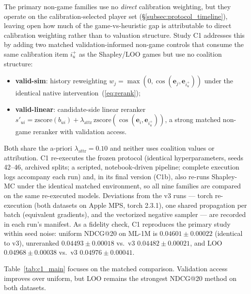 \documentclass[pdflatex,sn-mathphys-num]{sn-jnl}
\begin{document}
The primary non-game families use no \emph{direct} calibration weighting, but they operate on the calibration-selected player set (\S\ref{subsec:protocol_timeline}), leaving open how much of the game-vs-heuristic gap is attributable to direct calibration weighting rather than to valuation structure. Study C1 addresses this by adding two matched validation-informed non-game controls that consume the same calibration item $i_u^+$ as the Shapley/LOO games but use no coalition structure:
\begin{itemize}
    \item \textbf{valid-sim}: history reweighting $w_j=\max(0,\cos(\mathbf{e}_j,\mathbf{e}_{i_u^+}))$ under the identical native intervention~(\ref{eq:rerank});
    \item \textbf{valid-linear}: candidate-side linear reranker $s'_{ui}=\mathrm{zscore}(b_{ui})+\lambda_{\text{attr}}\,\mathrm{zscore}(\cos(\mathbf{e}_i,\mathbf{e}_{i_u^+}))$, a strong matched non-game reranker with validation access.
\end{itemize}
Both share the a-priori $\lambda_{\text{attr}}=0.10$ and neither uses coalition values or attribution. C1 re-executes the frozen protocol (identical hyperparameters, seeds 42--46, archived splits; a scripted, notebook-driven pipeline; complete execution logs accompany each run) and, in its final version (C1b), also re-runs Shapley-MC under the identical matched environment, so all nine families are compared on the same re-executed models. Deviations from the v3 runs --- torch re-execution (both datasets on Apple MPS, torch 2.3.1), one shared propagation per batch (equivalent gradients), and the vectorized negative sampler --- are recorded in each run's manifest. As a fidelity check, C1 reproduces the primary study within seed noise: uniform NDCG@20 on ML-1M is $0.04601\pm0.00022$ (identical to v3), unreranked $0.04493\pm0.00018$ vs.\ v3 $0.04482\pm0.00021$, and LOO $0.04968\pm0.00038$ vs.\ v3 $0.04976\pm0.00041$.

Table~\ref{tab:c1_main} focuses on the matched comparison. Validation access improves over uniform, but LOO remains the strongest NDCG@20 method on both datasets.
\end{document}

